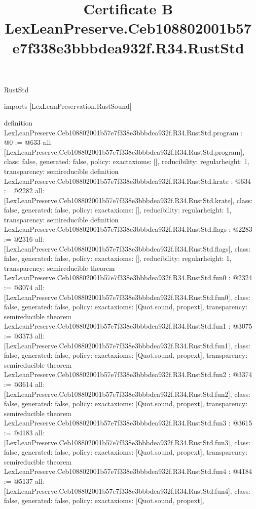 \begin{lexlean}{RustStd}
\title{Certificate B LexLeanPreserve.Ceb108802001b57e7f338e3bbbdea932f.R34.RustStd}
\begin{coremodule}
imports [LexLeanPreservation.RustSound]

definition LexLeanPreserve.Ceb108802001b57e7f338e3bbbdea932f.R34.RustStd.program : @0 := @633 {
  all: [LexLeanPreserve.Ceb108802001b57e7f338e3bbbdea932f.R34.RustStd.program],
  class: false,
  generated: false,
  policy: exact{axioms: []},
  reducibility: regular{height: 1},
  transparency: semireducible
}
definition LexLeanPreserve.Ceb108802001b57e7f338e3bbbdea932f.R34.RustStd.krate : @634 := @2282 {
  all: [LexLeanPreserve.Ceb108802001b57e7f338e3bbbdea932f.R34.RustStd.krate],
  class: false,
  generated: false,
  policy: exact{axioms: []},
  reducibility: regular{height: 1},
  transparency: semireducible
}
definition LexLeanPreserve.Ceb108802001b57e7f338e3bbbdea932f.R34.RustStd.flags : @2283 := @2316 {
  all: [LexLeanPreserve.Ceb108802001b57e7f338e3bbbdea932f.R34.RustStd.flags],
  class: false,
  generated: false,
  policy: exact{axioms: []},
  reducibility: regular{height: 1},
  transparency: semireducible
}
theorem LexLeanPreserve.Ceb108802001b57e7f338e3bbbdea932f.R34.RustStd.fun0 : @2324 := @3074 {
  all: [LexLeanPreserve.Ceb108802001b57e7f338e3bbbdea932f.R34.RustStd.fun0],
  class: false,
  generated: false,
  policy: exact{axioms: [Quot.sound, propext]},
  transparency: semireducible
}
theorem LexLeanPreserve.Ceb108802001b57e7f338e3bbbdea932f.R34.RustStd.fun1 : @3075 := @3373 {
  all: [LexLeanPreserve.Ceb108802001b57e7f338e3bbbdea932f.R34.RustStd.fun1],
  class: false,
  generated: false,
  policy: exact{axioms: [Quot.sound, propext]},
  transparency: semireducible
}
theorem LexLeanPreserve.Ceb108802001b57e7f338e3bbbdea932f.R34.RustStd.fun2 : @3374 := @3614 {
  all: [LexLeanPreserve.Ceb108802001b57e7f338e3bbbdea932f.R34.RustStd.fun2],
  class: false,
  generated: false,
  policy: exact{axioms: [Quot.sound, propext]},
  transparency: semireducible
}
theorem LexLeanPreserve.Ceb108802001b57e7f338e3bbbdea932f.R34.RustStd.fun3 : @3615 := @4183 {
  all: [LexLeanPreserve.Ceb108802001b57e7f338e3bbbdea932f.R34.RustStd.fun3],
  class: false,
  generated: false,
  policy: exact{axioms: [Quot.sound, propext]},
  transparency: semireducible
}
theorem LexLeanPreserve.Ceb108802001b57e7f338e3bbbdea932f.R34.RustStd.fun4 : @4184 := @5137 {
  all: [LexLeanPreserve.Ceb108802001b57e7f338e3bbbdea932f.R34.RustStd.fun4],
  class: false,
  generated: false,
  policy: exact{axioms: [Quot.sound, propext]},
}
\end{coremodule}
\end{lexlean}
